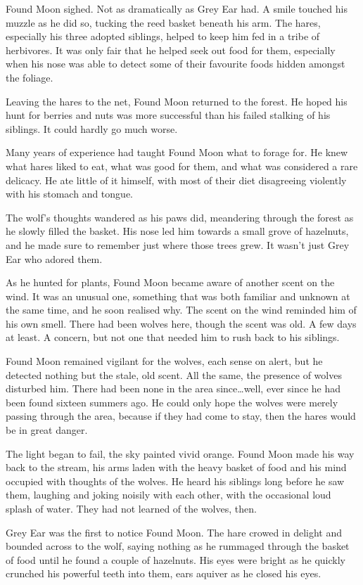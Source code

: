 Found Moon sighed. Not as dramatically as Grey Ear had. A smile touched his muzzle as he did so, tucking the reed basket beneath his arm. The hares, especially his three adopted siblings, helped to keep him fed in a tribe of herbivores. It was only fair that he helped seek out food for them, especially when his nose was able to detect some of their favourite foods hidden amongst the foliage.

Leaving the hares to the net, Found Moon returned to the forest. He hoped his hunt for berries and nuts was more successful than his failed stalking of his siblings. It could hardly go much worse.

Many years of experience had taught Found Moon what to forage for. He knew what hares liked to eat, what was good for them, and what was considered a rare delicacy. He ate little of it himself, with most of their diet disagreeing violently with his stomach and tongue.

The wolf's thoughts wandered as his paws did, meandering through the forest as he slowly filled the basket. His nose led him towards a small grove of hazelnuts, and he made sure to remember just where those trees grew. It wasn't just Grey Ear who adored them.

As he hunted for plants, Found Moon became aware of another scent on the wind. It was an unusual one, something that was both familiar and unknown at the same time, and he soon realised why. The scent on the wind reminded him of his own smell. There had been wolves here, though the scent was old. A few days at least. A concern, but not one that needed him to rush back to his siblings.

Found Moon remained vigilant for the wolves, each sense on alert, but he detected nothing but the stale, old scent. All the same, the presence of wolves disturbed him. There had been none in the area since\ldots{}well, ever since he had been found sixteen summers ago. He could only hope the wolves were merely passing through the area, because if they had come to stay, then the hares would be in great danger.

The light began to fail, the sky painted vivid orange. Found Moon made his way back to the stream, his arms laden with the heavy basket of food and his mind occupied with thoughts of the wolves. He heard his siblings long before he saw them, laughing and joking noisily with each other, with the occasional loud splash of water. They had not learned of the wolves, then.

Grey Ear was the first to notice Found Moon. The hare crowed in delight and bounded across to the wolf, saying nothing as he rummaged through the basket of food until he found a couple of hazelnuts. His eyes were bright as he quickly crunched his powerful teeth into them, ears aquiver as he closed his eyes.

